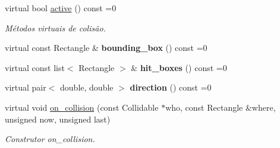 \begin{DoxyCompactItemize}
\mbox{\label{classSkill_a1744c0c7f03304b1a0444a1bd95661c0}} 
virtual bool \mbox{\hyperlink{classSkill_a1744c0c7f03304b1a0444a1bd95661c0}{active}} () const =0
\begin{DoxyCompactList}\small\item\em Métodos virtuais de colisão. \end{DoxyCompactList}\item 
\mbox{\label{classSkill_aa8b6a26b2f3586ca28b354f2da132e09}} 
virtual const Rectangle \& {\bfseries bounding\+\_\+box} () const =0
\item 
\mbox{\label{classSkill_a9973d969044e6972e36338928b5c4571}} 
virtual const list$<$ Rectangle $>$ \& {\bfseries hit\+\_\+boxes} () const =0
\item 
\mbox{\label{classSkill_a503e88f6eb131a401c7a7a49d87b1ab0}} 
virtual pair$<$ double, double $>$ {\bfseries direction} () const =0
\item 
virtual void \mbox{\hyperlink{classSkill_ae236be2ad572352fdf5f1e69eabe3dd3}{on\+\_\+collision}} (const Collidable $\ast$who, const Rectangle \&where, unsigned now, unsigned last)
\begin{DoxyCompactList}\small\item\em Construtor on\+\_\+collision. \end{DoxyCompactList}\end{DoxyCompactItemize}
